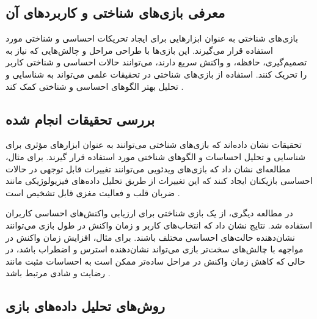 \documentclass[12pt]{article}
\begin{document}
\subsection{معرفی بازی‌های شناختی و کاربردهای آن}

بازی‌های شناختی به عنوان ابزارهایی برای ایجاد تحریکات احساسی و شناختی مورد استفاده قرار می‌گیرند. این بازی‌ها با طراحی مراحل و چالش‌هایی که نیاز به تصمیم‌گیری، حافظه، و واکنش سریع دارند، می‌توانند حالات احساسی و شناختی کاربر را تحریک کنند. استفاده از بازی‌های شناختی در تحقیقات علمی می‌تواند به شناسایی و تحلیل بهتر الگوهای احساسی و شناختی کمک کند \cite{He2020}.

\subsection{بررسی تحقیقات انجام شده}

تحقیقات نشان داده‌اند که بازی‌های شناختی می‌توانند به عنوان ابزارهای مؤثری برای شناسایی و تحلیل احساسات و الگوهای شناختی مورد استفاده قرار گیرند. برای مثال، مطالعه‌ای نشان داد که بازی‌های ویدئویی می‌توانند تغییرات قابل توجهی در حالات احساسی بازیکنان ایجاد کنند که این تغییرات از طریق تحلیل داده‌های فیزیولوژیکی مانند ضربان قلب و فعالیت مغزی قابل تشخیص است \cite{Ravaja2006}.

در مطالعه دیگری، از یک بازی شناختی برای ارزیابی واکنش‌های احساسی کاربران استفاده شد. نتایج نشان داد که انتخاب‌های کاربر و زمان واکنش در طول بازی می‌توانند نشان‌دهنده حالت‌های احساسی مختلف باشند. برای مثال، افزایش زمان واکنش در مواجهه با چالش‌های سخت‌تر بازی می‌تواند نشان‌دهنده استرس و اضطراب باشد، در حالی که کاهش زمان واکنش در مراحل ساده‌تر ممکن است به احساسات مثبت مانند رضایت و شادی مرتبط باشد \cite{Mandryk2007}.

\subsection{روش‌های تحلیل داده‌های بازی}
\end{document}
